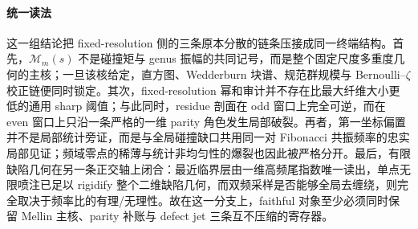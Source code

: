 \paragraph{统一读法}
这一组结论把 fixed-resolution 侧的三条原本分散的链条压接成同一终端结构。首先，\(\mathcal M_m(s)\) 不是碰撞矩与 genus 振幅的共同记号，而是整个固定尺度多重度几何的主核；一旦该核给定，直方图、Wedderburn 块谱、规范群规模与 Bernoulli--\(\zeta\) 校正链便同时锁定。其次，fixed-resolution 幂和审计并不存在比最大纤维大小更低的通用 sharp 阈值；与此同时，residue 剖面在 odd 窗口上完全可逆，而在 even 窗口上只沿一条严格的一维 parity 角色发生局部破裂。再者，第一坐标偏置并不是局部统计旁证，而是与全局碰撞缺口共用同一对 Fibonacci 共振频率的忠实局部见证；频域零点的稀薄与统计非均匀性的爆裂也因此被严格分开。最后，有限缺陷几何在另一条正交轴上闭合：最近临界层由一维高频尾指数唯一读出，单点无限喷注已足以 rigidify 整个二维缺陷几何，而双频采样是否能够全局去缠绕，则完全取决于频率比的有理/无理性。故在这一分支上，faithful 对象至少必须同时保留 Mellin 主核、parity 补账与 defect jet 三条互不压缩的寄存器。

\endinput

